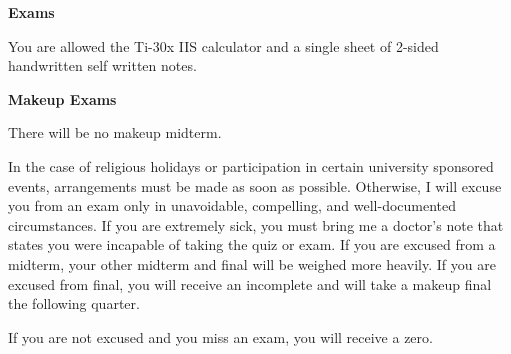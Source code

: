 \documentclass{article}
\begin{document}
\textbf{Exams}

You are allowed the Ti-30x IIS calculator and a single sheet of 2-sided
handwritten self written notes.

\textbf{Makeup Exams}

There will be no makeup midterm.

In the case of religious holidays or participation in certain university
sponsored events, arrangements must be made as soon as possible. Otherwise, I
will excuse you from an exam only in unavoidable, compelling, and
well-documented circumstances. If you are extremely sick, you must bring me a
doctor's note that states you were incapable of taking the quiz or exam. If you
are excused from a midterm, your other midterm and final will be weighed more
heavily. If you are excused from final, you will receive an incomplete and will
take a makeup final the following quarter.

If you are not excused and you miss an exam, you will receive a zero.
\end{document}

